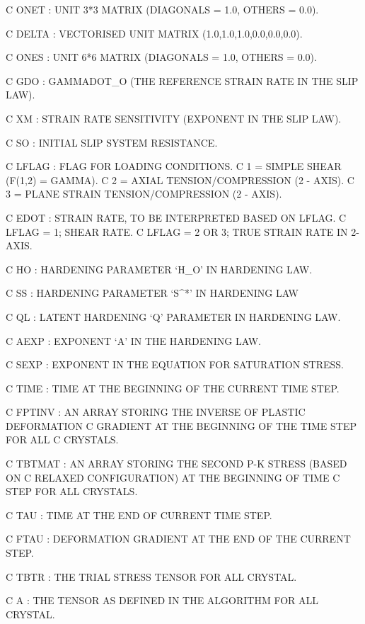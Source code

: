 C   ONET        : UNIT 3*3 MATRIX (DIAGONALS = 1.0, OTHERS = 0.0).

C   DELTA       : VECTORISED UNIT MATRIX (1.0,1.0,1.0,0.0,0.0,0.0).

C   ONES        : UNIT 6*6 MATRIX (DIAGONALS = 1.0, OTHERS = 0.0).

C   GDO         : GAMMADOT_O (THE REFERENCE STRAIN RATE IN THE SLIP LAW).

C   XM          : STRAIN RATE SENSITIVITY (EXPONENT IN THE SLIP LAW).

C   SO          : INITIAL SLIP SYSTEM RESISTANCE.

C   LFLAG       : FLAG FOR LOADING CONDITIONS.
C                   1 = SIMPLE SHEAR (F(1,2) = GAMMA).
C                   2 = AXIAL TENSION/COMPRESSION (2 - AXIS).
C                   3 = PLANE STRAIN TENSION/COMPRESSION (2 - AXIS). 

C   EDOT        : STRAIN RATE, TO BE INTERPRETED BASED ON LFLAG.
C                   LFLAG = 1; SHEAR RATE.
C                   LFLAG = 2 OR 3; TRUE STRAIN RATE IN 2-AXIS.

C   HO          : HARDENING PARAMETER `H_O' IN HARDENING LAW. 

C   SS          : HARDENING PARAMETER `S^*' IN HARDENING LAW 

C   QL          : LATENT HARDENING `Q' PARAMETER IN HARDENING LAW.

C   AEXP        : EXPONENT `A' IN THE HARDENING LAW.

C   SEXP        : EXPONENT IN THE EQUATION FOR SATURATION STRESS.   

C   TIME        : TIME AT THE BEGINNING OF THE CURRENT TIME STEP.

C   FPTINV      : AN ARRAY STORING THE INVERSE OF PLASTIC DEFORMATION 
C                 GRADIENT AT THE BEGINNING OF THE TIME STEP FOR ALL 
C                 CRYSTALS.

C   TBTMAT      : AN ARRAY STORING THE SECOND P-K STRESS (BASED ON
C                 RELAXED CONFIGURATION) AT THE BEGINNING OF TIME 
C                 STEP FOR ALL CRYSTALS.
 
C   TAU         : TIME AT THE END OF CURRENT TIME STEP.

C   FTAU        : DEFORMATION GRADIENT AT THE END OF THE CURRENT STEP.

C   TBTR        : THE TRIAL STRESS TENSOR FOR ALL CRYSTAL.

C   A           : THE TENSOR AS DEFINED IN THE ALGORITHM FOR ALL CRYSTAL.

